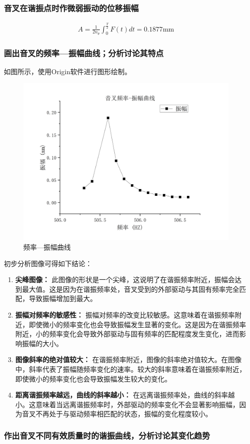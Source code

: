 \documentclass[dvipsnames, svgnames,a4paper,11pt]{article}
\begin{document}
	\subsubsection{ 音叉在谐振点时作微弱振动的位移振幅}
	$$\begin{aligned}A=\frac{1}{2n_\theta}\int_0^{\frac{T}{2}}F(t)dt=0.1877\text{mm}\end{aligned}$$
	\subsubsection{ 画出音叉的频率—振幅曲线；分析讨论其特点}
	如图所示，使用Origin软件进行图形绘制。
	\begin{figure}[H]
		\centering
		\includegraphics[width=0.4\linewidth]{images/振幅曲线}
		\caption{频率—振幅曲线}
		\label{频率—振幅曲线}
	\end{figure}
	初步分析图像可得如下结论：
	\begin{enumerate}
		\item \textbf{尖峰图像：} 此图像的形状是一个尖峰，这说明了在谐振频率附近，振幅会达到最大值。这是因为在谐振频率处，音叉受到的外部驱动与其固有频率完全匹配，导致振幅增加到最大。
		
		\item \textbf{振幅对频率的敏感性：} 振幅对频率的改变比较敏感。这意味着在谐振频率附近，即使微小的频率变化也会导致振幅发生显著的变化。这是因为在谐振频率附近，小的频率变化会导致外部驱动与固有频率的匹配程度发生变化，进而影响振幅的大小。
		
		\item \textbf{图像斜率的绝对值较大：} 在谐振频率附近，图像的斜率绝对值较大。在图像中，斜率代表了振幅随频率变化的速率。较大的斜率意味着在谐振频率附近，即使微小的频率变化也会导致振幅发生较大的变化。
		
		\item \textbf{距离谐振频率越远，曲线的斜率越小：} 在远离谐振频率处，曲线的斜率越小。这意味着当远离谐振频率时，外部驱动的频率变化不会显著影响振幅，因为音叉不再处于与驱动频率相匹配的状态，振幅的变化程度较小。
	\end{enumerate}
	\subsubsection{作出音叉不同有效质量时的谐振曲线，分析讨论其变化趋势}
	
\end{document}
